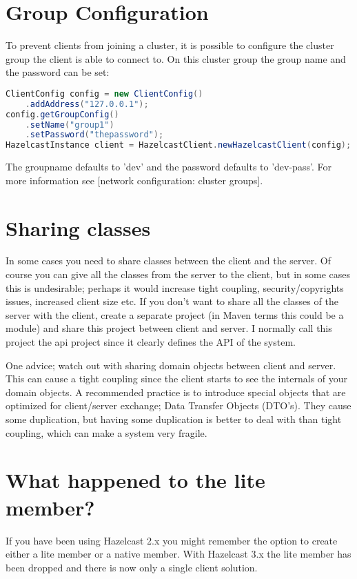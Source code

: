 \section{Group Configuration}
To prevent clients from joining a cluster, it is possible to configure the cluster group the client is able to connect to. On this cluster group the group name and the password can be set:
\begin{lstlisting}[language=java]
ClientConfig config = new ClientConfig()
    .addAddress("127.0.0.1");
config.getGroupConfig()
    .setName("group1")
    .setPassword("thepassword");
HazelcastInstance client = HazelcastClient.newHazelcastClient(config);
\end{lstlisting}
The groupname defaults to 'dev' and the password defaults to 'dev-pass'. For more information see [network configuration: cluster groups].

\section{Sharing classes}
In some cases you need to share classes between the client and the server. Of course you can give all the classes from the server to the client, but in some cases this is undesirable; perhaps it would increase tight coupling, security/copyrights issues, increased client size etc. If you don't want to share all the classes of the server with the client, create a separate project (in Maven terms this could be a module) and share this project between client and server. I normally call this project the api project since it clearly defines the API of the system. 

One advice; watch out with sharing domain objects between client and server. This can cause a tight coupling since the client starts to see the internals of your domain objects. A recommended practice is to introduce special objects that are optimized for client/server exchange; Data Transfer Objects (DTO's). They cause some duplication, but having some duplication is better to deal with than tight coupling, which can make a system very fragile.

\section{What happened to the lite member?}
If you have been using Hazelcast 2.x you might remember the option to create either a lite member or a native member. With Hazelcast 3.x the lite member has been dropped and there is now only a single client solution.

